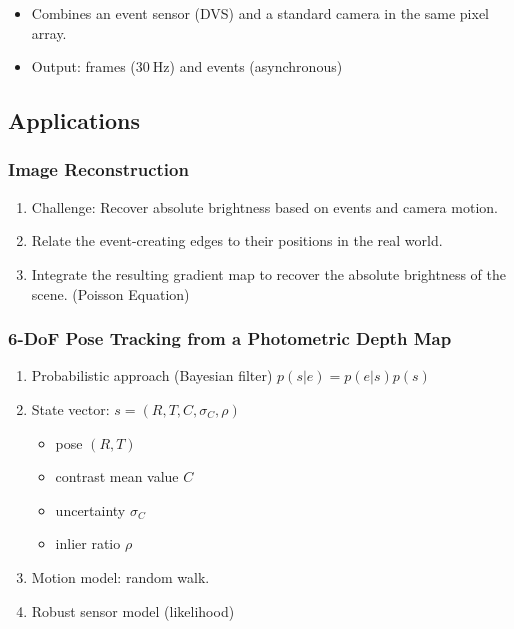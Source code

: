 \documentclass[10pt,a4paper]{scrartcl}
\begin{document}
\begin{multicols*}{2}

\begin{itemize}
\item Combines an event sensor (DVS) and a standard camera in the same pixel array.
\item Output: frames ($\SI{30}{\hertz}$) and events (asynchronous)
\end{itemize}

\subsection{Applications}

\subsubsection{Image Reconstruction}

\begin{enumerate}
\item Challenge: Recover absolute brightness based on events and camera motion.
\item Relate the event-creating edges to their positions in the real world.
\item Integrate the resulting gradient map to recover the absolute brightness of the scene. (Poisson Equation)
\end{enumerate}

\subsubsection{6-DoF Pose Tracking from a Photometric Depth Map}

\begin{enumerate}
\item Probabilistic approach (Bayesian filter) $p(s|e)=p(e|s)p(s)$
\item State vector: $s=(R,T,C,\sigma_C,\rho)$
\begin{itemize}
\item pose $(R,T)$
\item contrast mean value $C$
\item uncertainty $\sigma_C$
\item inlier ratio $\rho$
\end{itemize}
\item Motion model: random walk.
\item Robust sensor model (likelihood)
\end{enumerate}


\end{multicols*}
\end{document}
